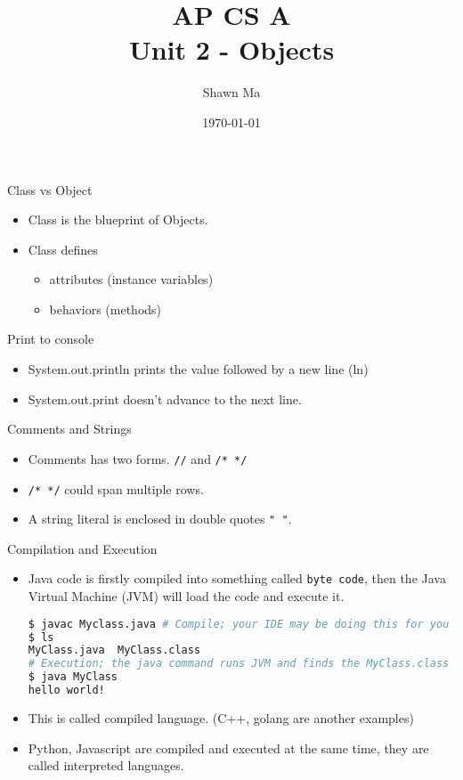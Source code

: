 \documentclass[aspectratio=169]{beamer}
\title{AP CS A\\Unit 2 - Objects}
\date{\today}
\author{Shawn Ma}
\begin{document}
    \maketitle
    \begin{frame}[fragile]{Class vs Object}
\begin{itemize}
    \item Class is the \alert{blueprint} of Objects.
    \item Class defines
    \begin{itemize}
        \item attributes (instance variables)
        \item behaviors (methods)
    \end{itemize}
\end{itemize}

\end{frame}


\begin{frame}{Print to console}
\begin{itemize}
    \item \alert{System.out.println} prints the value followed by a new line (ln)
    \item \alert{System.out.print} doesn't advance to the next line.

\end{itemize}
\end{frame}

\begin{frame}[fragile]{Comments and Strings}
\begin{itemize}
    \item \alert{Comments} has two forms. \verb|//| and \verb|/* */|
    \item \verb|/* */| could span multiple rows.
    \item A string literal is enclosed in double quotes \verb|" "|.
\end{itemize}
\end{frame}

\begin{frame}[fragile]{Compilation and Execution}
\begin{itemize}
    \item Java code is firstly \alert{compiled} into something called \verb|byte code|,
        then the Java Virtual Machine (JVM) will load the code and \alert{execute} it.
        \begin{lstlisting}[language=bash]
$ javac Myclass.java # Compile; your IDE may be doing this for you
$ ls
MyClass.java  MyClass.class
# Execution; the java command runs JVM and finds the MyClass.class and its main method
$ java MyClass
hello world!
            \end{lstlisting}
    \item This is called \alert{compiled} language. (C++, golang are another examples)
    \item Python, Javascript are compiled and executed at the same time, they are called \alert{interpreted} languages.
\end{itemize}
\end{frame}
\end{document}

